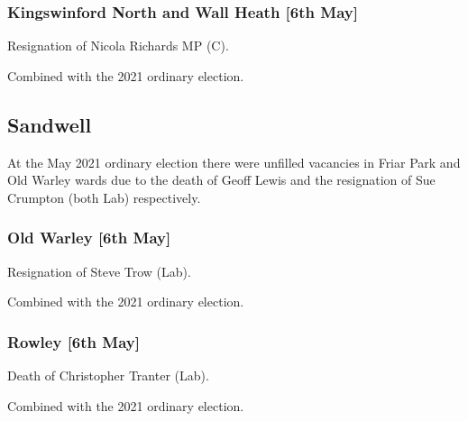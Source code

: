\documentclass[a4paper,openany]{book}
\begin{document}
\begin{resultsiii}
\subsubsection*{Kingswinford North and Wall Heath \hspace*{\fill}\nolinebreak[1]%
	\enspace\hspace*{\fill}
	[6th May]}


Resignation of Nicola Richards MP (C).

Combined with the 2021 ordinary election.

\subsection*{Sandwell}

At the May 2021 ordinary election there were unfilled vacancies in Friar Park and Old Warley wards due to the death of Geoff Lewis and the resignation of Sue Crumpton (both Lab) respectively.

\subsubsection*{Old Warley \hspace*{\fill}\nolinebreak[1]%
	\enspace\hspace*{\fill}
	[6th May]}


Resignation of Steve Trow (Lab).

Combined with the 2021 ordinary election.

\subsubsection*{Rowley \hspace*{\fill}\nolinebreak[1]%
	\enspace\hspace*{\fill}
	[6th May]}


Death of Christopher Tranter (Lab).

Combined with the 2021 ordinary election.


\end{resultsiii}
\end{document}
